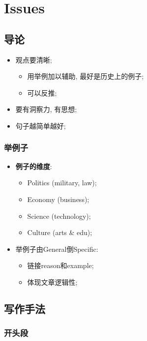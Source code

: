 \chapter{Issues}

\section{导论}

  \begin{itemize}
    \item 观点要清晰;
    \begin{itemize}
      \item 用举例加以辅助, 最好是历史上的例子;
      \item 可以反推;
    \end{itemize}

    \item 要有洞察力, 有思想;
    \item 句子越简单越好;
  \end{itemize}

  \subsection{举例子}

    \begin{itemize}
      \item \textbf{例子的维度}:
      \begin{itemize}
        \item Politics (military, law);
        \item Economy (business);
        \item Science (technology);
        \item Culture (arts \& edu);
      \end{itemize}

      \item 举例子由General倒Specific:
      \begin{itemize}
        \item 链接reason和example;
        \item 体现文章逻辑性;
      \end{itemize}
    \end{itemize}

\section{写作手法}

  \subsection{开头段}

